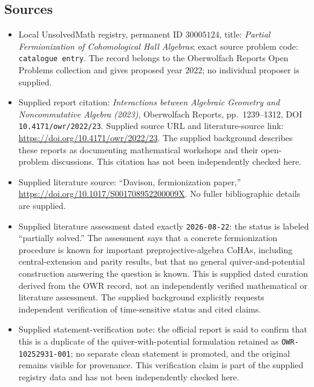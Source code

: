 \documentclass[11pt]{article}
\begin{document}
\subsection{Sources}
\begin{itemize}
\item Local UnsolvedMath registry, permanent ID \(30005124\), title: \emph{Partial Fermionization of Cohomological Hall Algebras}; exact source problem code: \texttt{catalogue entry}. The record belongs to the Oberwolfach Reports Open Problems collection and gives proposed year \(2022\); no individual proposer is supplied.
\item Supplied report citation: \emph{Interactions between Algebraic Geometry and Noncommutative Algebra (2023)}, Oberwolfach Reports, pp.~1239--1312, DOI \texttt{10.4171/owr/2022/23}. Supplied source URL and literature-source link: \url{https://doi.org/10.4171/owr/2022/23}. The supplied background describes these reports as documenting mathematical workshops and their open-problem discussions. This citation has not been independently checked here.
\item Supplied literature source: ``Davison, fermionization paper,'' \url{https://doi.org/10.1017/S001708952200009X}. No fuller bibliographic details are supplied.
\item Supplied literature assessment dated exactly \texttt{2026-08-22}: the status is labeled ``partially solved.'' The assessment says that a concrete fermionization procedure is known for important preprojective-algebra CoHAs, including central-extension and parity results, but that no general quiver-and-potential construction answering the question is known. This is supplied dated curation derived from the OWR record, not an independently verified mathematical or literature assessment. The supplied background explicitly requests independent verification of time-sensitive status and cited claims.
\item Supplied statement-verification note: the official report is said to confirm that this is a duplicate of the quiver-with-potential formulation retained as \texttt{OWR-10252931-001}; no separate clean statement is promoted, and the original remains visible for provenance. This verification claim is part of the supplied registry data and has not been independently checked here.
\end{itemize}
\end{document}

